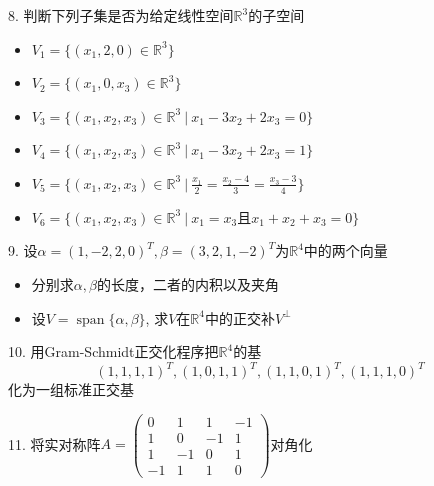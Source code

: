 
\begin{frame}

8. 判断下列子集是否为给定线性空间$\mathbb{R}^3$的子空间\\
\begin{itemize}
\item[(1)] $V_1 = \{(x_1,2,0) \in \mathbb{R}^3\}$
\vspace{0.4em}
\item[(2)] $V_2 = \{(x_1,0,x_3) \in \mathbb{R}^3\}$
\vspace{0.4em}
\item[(3)] $V_3 = \{(x_1,x_2,x_3) \in \mathbb{R}^3 \ |\ x_1-3x_2+2x_3=0\}$
\vspace{0.4em}
\item[(4)] $V_4 = \{(x_1,x_2,x_3) \in \mathbb{R}^3 \ |\ x_1-3x_2+2x_3=1\}$
\vspace{0.4em}
\item[(5)] $V_5 = \{(x_1,x_2,x_3) \in \mathbb{R}^3 \ |\ \frac{x_1}{2}=\frac{x_2-4}{3}=\frac{x_3-3}{4}\}$
\vspace{0.4em}
\item[(6)] $V_6 = \{(x_1,x_2,x_3) \in \mathbb{R}^3 \ |\ x_1=x_3\mbox{且}x_1+x_2+x_3=0\}$
\end{itemize}

\end{frame}


\begin{frame}

9. 设$\alpha = (1,-2,2,0)^T, \beta = (3,2,1,-2)^T$为$\mathbb{R}^4$中的两个向量
\begin{itemize}
\item[(1)] 分别求$\alpha, \beta$的长度，二者的内积以及夹角
\vspace{0.4em}
\item[(2)] 设$V = \operatorname{span}\{\alpha, \beta\}$, 求$V$在$\mathbb{R}^4$中的正交补$V^{\perp}$
\end{itemize}

\vspace{1em}

10. 用Gram-Schmidt正交化程序把$\mathbb{R}^4$的基
$$(1,1,1,1)^T,(1,0,1,1)^T,(1,1,0,1)^T,(1,1,1,0)^T$$
化为一组标准正交基

\vspace{1em}

11. 将实对称阵$A = \begin{pmatrix} 0 & 1 & 1 & -1 \\ 1 & 0 & -1 & 1 \\ 1 & -1 & 0 & 1 \\ - 1 & 1 & 1 & 0 \end{pmatrix}$对角化

\end{frame}

